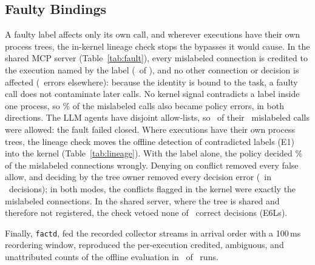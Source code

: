 \begin{table}[t]
\centering
\caption{Binding faults injected into the framework: a fraction $p$ of each execution's tool calls carries another execution's identity (task-scoped binding; tools pooled; \FaultEfiveRuns\ E5f, \FaultEsixRuns\ E6f, and \FaultEsevenRuns\ E7f runs). Wrong: mislabeled connections credited to the wrong execution; other err.: errors on correctly labeled calls.}
\label{tab:fault}
\footnotesize
\setlength{\tabcolsep}{2.2pt}
\end{table}

\begin{table}[t]
\centering
\caption{E6L: policy decisions with mislabeled calls when executions have their own process trees (N0 and N1, both operation modes pooled; \LinRuns\ confirmatory runs over two boots). Conflicts: contradictions between label and process tree flagged in the kernel.}
\label{tab:lineage}
\footnotesize
\setlength{\tabcolsep}{2.4pt}
\end{table}

\subsection{Faulty Bindings}

A faulty label affects only its own call, and wherever executions have their own process trees, the in-kernel lineage check stops the bypasses it would cause. In the shared MCP server (Table~\ref{tab:fault}), every mislabeled connection is credited to the execution named by the label (\FaultMisWrong\ of \FaultMis), and no other connection or decision is affected (\FaultSpill\ errors elsewhere): because the identity is bound to the task, a faulty call does not contaminate later calls. No kernel signal contradicts a label inside one process, so \FaultPolErrPct\% of the mislabeled calls also became policy errors, in both directions. The LLM agents have disjoint allow-lists, so \FaultEsevenAllowed\ of their \FaultEsevenMis\ mislabeled calls were allowed: the fault failed closed. Where executions have their own process trees, the lineage check moves the offline detection of contradicted labels (E1) into the kernel (Table~\ref{tab:lineage}). With the label alone, the policy decided \LinModeZeroPct\% of the mislabeled connections wrongly. Denying on conflict removed every false allow, and deciding by the tree owner removed every decision error (\LinModeTwoErr\ in \LinModeTwoDec\ decisions); in both modes, the conflicts flagged in the kernel were exactly the mislabeled connections. In the shared server, where the tree is shared and therefore not registered, the check vetoed none of \LsDecisions\ correct decisions (E6Ls).

Finally, \texttt{factd}, fed the recorded collector streams in arrival order with a 100\,ms reordering window, reproduced the per-execution credited, ambiguous, and unattributed counts of the offline evaluation in \FactdEqual\ of \FactdRuns\ runs.
